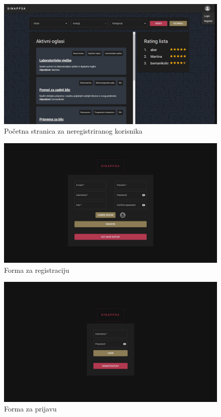 			\begin{figure}[H]
				\includegraphics[scale=0.37]{slike/neregistrirani.jpg}
				\centering
				\caption{Početna stranica za neregistriranog korisnika}
				\label{fig:neregistriran}
			\end{figure} 
		
			\begin{figure}[H]
				\includegraphics[scale=0.37]{slike/registracija.jpg} 
				\centering
				\caption{Forma za registraciju}
				\label{fig:registracija}
			\end{figure}
		
			\begin{figure}[H]
				\includegraphics[scale=0.37]{slike/login.jpg} 
				\centering
				\caption{Forma za prijavu}
				\label{fig:prijava}
			\end{figure}
		
